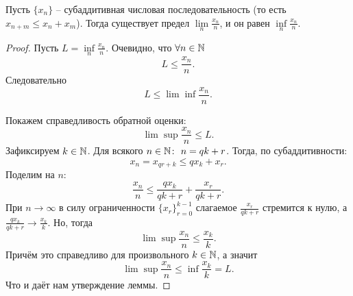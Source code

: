 \begin{lemma}[Фекете]
    Пусть $\{x_n\}$ -- субаддитивная числовая последовательность (то есть $x_{n + m} \leq x_n + x_m$).
    Тогда существует предел $\lim\limits_{n} \frac{x_n}{n}$, и он равен $\inf\limits_{n} \frac{x_n}{n}$.
\end{lemma}
\begin{proof}
    Пусть $L = \inf\limits_{n} \frac{x_n}{n}$.
    Очевидно, что $\forall n \in \mathbb{N}$
    \[
        L \leq \frac{x_n}{n}.
    \]
    Следовательно
    \[
        L \leq \lim\inf \frac{x_n}{n}.
    \]

    Покажем справедливость обратной оценки:
    \[
        \lim\sup \frac{x_n}{n} \leq L.
    \]
    Зафиксируем $k \in \mathbb{N}$. Для всякого $n \in \mathbb{N}\colon \ n = qk + r$.
    Тогда, по субаддитивности:
    \[
        x_n = x_{qr + k} \leq qx_k + x_r.
    \]
    Поделим на $n\colon$
    \[
        \frac{x_n}{n} \leq \frac{qx_k}{qk + r} + \frac{x_r}{qk + r}.
    \]
    При $n \rightarrow \infty$ в силу ограниченности $\{x_r\}_{r = 0}^{k - 1}$ слагаемое $\frac{x_r}{qk + r}$ стремится к нулю, а $\frac{qx_k}{qk + r} \rightarrow \frac{x_k}{k}$.
    Но, тогда
    \[
        \lim\sup \frac{x_n}{n} \leq \frac{x_k}{k}.
    \]
    Причём это справедливо для произвольного $k \in \mathbb{N}$, а значит
    \[
        \lim\sup \frac{x_n}{n} \leq \inf \frac{x_k}{k} = L.
    \]
    Что и даёт нам утверждение леммы.
\end{proof}

